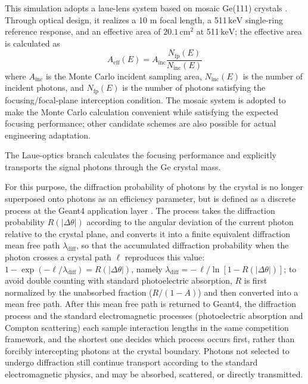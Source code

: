 \documentclass[11pt]{article}
\newcommand{\keV}{\ensuremath{\,\mathrm{keV}}}
\begin{document}
This simulation adopts a laue-lens system based on mosaic Ge(111) crystals \cite{Barriere2009Laue,Barriere2011LauePrototype}. Through optical design, it realizes a 10 m focal length, a 511\keV{} single-ring reference response, and an effective area of $20.1\,\mathrm{cm^2}$ at 511\keV; the effective area is calculated as
\begin{equation}
  A_{\mathrm{eff}}(E)=A_{\mathrm{inc}}\frac{N_{\mathrm{fp}}(E)}{N_{\mathrm{inc}}(E)}
  \label{eq:laue_aeff}
\end{equation}
where $A_{\mathrm{inc}}$ is the Monte Carlo incident sampling area, $N_{\mathrm{inc}}(E)$ is the number of incident photons, and $N_{\mathrm{fp}}(E)$ is the number of photons satisfying the focusing/focal-plane interception condition.
The mosaic system is adopted to make the Monte Carlo calculation convenient while satisfying the expected focusing performance; other candidate schemes are also possible for actual engineering adaptation.

The Laue-optics branch calculates the focusing performance and explicitly transports the signal photons through the Ge crystal mass.

For this purpose, the diffraction probability of photons by the crystal is no longer superposed onto photons as an efficiency parameter, but is defined as a discrete process at the Geant4 application layer \cite{Agostinelli2003,Allison2016}. The process takes the diffraction probability $R(|\Delta\theta|)$ according to the angular deviation of the current photon relative to the crystal plane, and converts it into a finite equivalent diffraction mean free path $\lambda_{\mathrm{diff}}$, so that the accumulated diffraction probability when the photon crosses a crystal path $\ell$ reproduces this value: $1-\exp(-\ell/\lambda_{\mathrm{diff}})=R(|\Delta\theta|)$, namely $\lambda_{\mathrm{diff}}=-\,\ell/\ln[1-R(|\Delta\theta|)]$; to avoid double counting with standard photoelectric absorption, $R$ is first normalized by the unabsorbed fraction ($R/(1-A)$) and then converted into a mean free path. After this mean free path is returned to Geant4, the diffraction process and the standard electromagnetic processes (photoelectric absorption and Compton scattering) each sample interaction lengths in the same competition framework, and the shortest one decides which process occurs first, rather than forcibly intercepting photons at the crystal boundary. Photons not selected to undergo diffraction still continue transport according to the standard electromagnetic physics, and may be absorbed, scattered, or directly transmitted.
\end{document}

